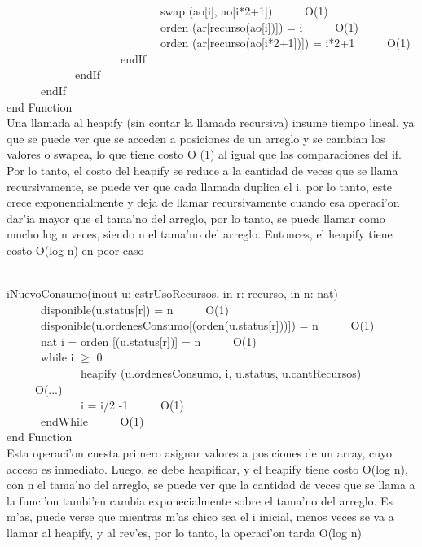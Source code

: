 \documentclass[a4paper,10pt]{article}
\begin{document}
\begin{algoritmo}
	\indent \ \ \ \ \ \ \ \ \ \ \ \ \ \ \ \ \ \ \ \ \ \ \ \ \ \ \  swap (ao[i], ao[i*2+1]) \ \ \ \ \ O(1) \\
	\indent \ \ \ \ \ \ \ \ \ \ \ \ \ \ \ \ \ \ \ \ \ \ \ \ \ \ \  orden (ar[recurso(ao[i])]) = i  \ \ \ \ \ O(1) \\
	\indent \ \ \ \ \ \ \ \ \ \ \ \ \ \ \ \ \ \ \ \ \ \ \ \ \ \ \ orden (ar[recurso(ao[i*2+1])]) = i*2+1  \ \ \ \ \ O(1) \\
	\indent \ \ \ \ \ \ \ \ \ \ \ \ \ \ \ \ \ \ \ \  endIf \\
	\indent \ \ \ \ \ \ \ \ \ \ \ \ endIf \\
	\indent \ \ \ \ \ \ endIf \\
   end Function \\
   
   Una llamada al heapify (sin contar la llamada recursiva) insume tiempo lineal, ya que se puede ver que se acceden a posiciones de un arreglo y se cambian los valores o swapea, lo que tiene costo O (1) al igual que las comparaciones del if. Por lo tanto, el costo del heapify se reduce a la cantidad de veces que se llama recursivamente, se puede ver que cada llamada duplica el i, por lo tanto, este crece exponencialmente y deja de llamar recursivamente cuando esa operaci'on dar'ia mayor que el tama'no del arreglo, por lo tanto, se puede llamar como mucho log n veces, siendo n el tama'no del arreglo. Entonces, el heapify tiene costo O(log n) en peor caso
\end{algoritmo}

\begin{algoritmo}
\caption{}\\
  iNuevoConsumo(inout u: estrUsoRecursos, in r: recurso, in n: nat)\\
	\indent \ \ \ \ \ \  disponible(u.status[r]) = n  \ \ \ \ \ O(1)\\
	\indent \ \ \ \ \ \  disponible(u.ordenesConsumo[(orden(u.status[r]))]) = n  \ \ \ \ \ O(1)\\
	\indent \ \ \ \ \ \  nat i = orden [(u.status[r])] = n  \ \ \ \ \ O(1)\\	
	\indent \ \ \ \ \ \  while i $\geq$ 0 \\
	\indent \ \ \ \ \ \ \ \ \ \ \ \ \ heapify (u.ordenesConsumo, i, u.status, u.cantRecursos) \ \ \ \ \ O(...) \\
	\indent \ \ \ \ \ \ \ \ \ \ \ \ \ i = i/2 -1 \ \ \ \ \ O(1) \\
	\indent \ \ \ \ \ \  endWhile \ \ \ \ \ O(1)\\
   end Function \\
   
   Esta operaci'on cuesta primero asignar valores a posiciones de un array, cuyo acceso es inmediato. Luego, se debe heapificar, y el heapify tiene costo O(log n), con n el tama'no del arreglo, se puede ver que la cantidad de veces que se llama a la funci'on tambi'en cambia exponecialmente sobre el tama'no del arreglo. Es m'as, puede verse que mientras m'as chico sea el i inicial, menos veces se va a llamar al heapify, y al rev'es, por lo tanto, la operaci'on tarda O(log n)
   
\end{algoritmo}
\end{document}
